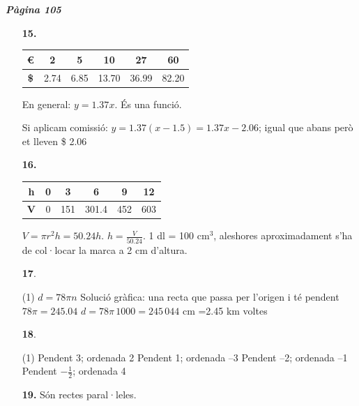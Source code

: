 \documentclass[a4paper, pdf, twoside]{book}
\begin{document}
\begin{multicols}{2}
{\textbf{\em Pàgina 105}} \hrulefill
\begin{enumerate}
\vspace{0.25cm}
\item[\fontfamily{phv}\selectfont\color{blue}\textbf{15. }] 
 \begin {tabular}{|c|c|c|c|c|c|} \hline \cellcolor {lightgray}\textbf {\euro {}} & 2 & 5 & 10 & 27 & 60 \\ [0.3cm] \hline \cellcolor {lightgray}\textbf {\$} &2.74 & 6.85 & 13.70 & 36.99 & 82.20 \\ [0.3cm] \hline \end {tabular}\par En general: $y=1.37 x$. És una funció.\par Si aplicam comissió: $y=1.37 (x - 1.5)=1.37 x -2.06$; igual que abans però et lleven \$ 2.06 
 \end{enumerate}
\begin{enumerate}
\vspace{0.25cm}
\item[\fontfamily{phv}\selectfont\color{blue}\textbf{16. }] 
\begin {tabular}{|c|c|c|c|c|c|} \hline \cellcolor {lightgray}\textbf {h} & 0 & 3 & 6 & 9 & 12 \\ [0.3cm] \hline \cellcolor {lightgray}\textbf {V} & 0 & 151 & 301.4 & 452 & 603 \\ [0.3cm] \hline \end {tabular}\par $V=\pi r^2 h = 50.24 h$. $h=\frac {V}{50.24}$. 1 dl = 100 cm$^3$, aleshores aproximadament s'ha de col·locar la marca a 2 cm d'altura. 
\vspace{0.25cm}



 \item[\fontfamily{phv}\selectfont\color{blue}\textbf{17}. ] 
 \begin{tasks}[column-sep=1em, item-indent=1.3333em](1)
	 \task $d=78\pi n$
	 \task* Solució gràfica: una recta que passa per l'origen i té pendent $78\pi =245.04$
	 \task* $d=78\pi \,1000=245\,044$ cm =2.45 km
	  voltes
\end{tasks}
\vspace{0.25cm}



 \item[\fontfamily{phv}\selectfont\color{blue}\textbf{18}. ] 
 \begin{tasks}[column-sep=1em, item-indent=1.3333em](1)
	 \task Pendent 3; ordenada 2
	 \task Pendent 1; ordenada --3
	 \task Pendent --2; ordenada --1
	 \task* Pendent $-\frac {1}{2}$; ordenada 4
\end{tasks}
\vspace{0.25cm}
\item[\fontfamily{phv}\selectfont\color{blue}\textbf{19. }] 
Són rectes paral·leles.
 \end{enumerate}
\vspace{0.3cm}


\end{multicols}
\end{document}
